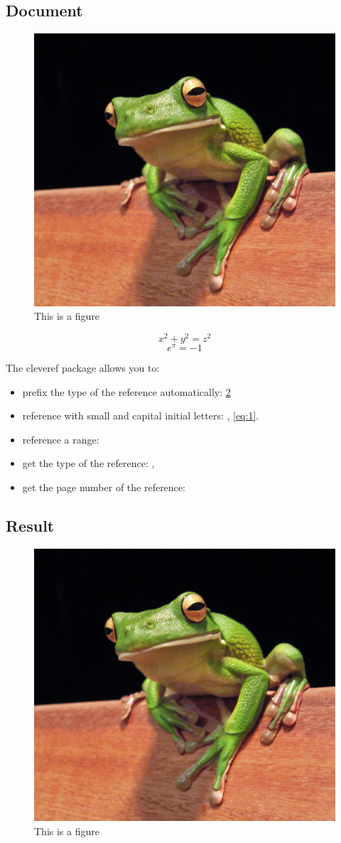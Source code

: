 \documentclass{article}
\begin{document}
\subsection*{Document}
\begin{latex}
\begin{figure}[b]
	\centering
	\includegraphics[width=0.25\linewidth]{frog.jpg}
	\caption{This is a figure}
	\label{fig:1}
\end{figure}

\begin{equation}
x^2+y^2=z^2
\label{eq:1}
\end{equation}
\begin{equation}
e^{\pi} = -1
\label{eq:2}
\end{equation}

The cleveref package allows you to:
\begin{itemize}
	\item prefix the type of the reference automatically: \cref{fig:1}
	\item reference with small and capital initial letters: , \cref{eq:1}.
	\item reference a range: 
	\item get the type of the reference: , 
	\item get the page number of the reference: 
\end{itemize}
\end{latex}

\subsection*{Result}
\begin{figure}[h]
	\centering
	\includegraphics[width=0.25\linewidth]{frog.jpg}
	\caption{This is a figure}
	\label{fig:1}
\end{figure}
\end{document}
